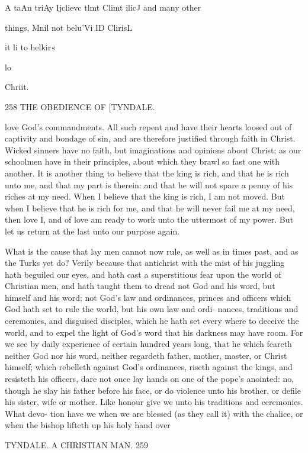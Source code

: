 \documentclass{custom}
\begin{document}
{{A taAn triAy 
Ijclievc tlmt 
Climt ilicJ 
and many 
other 

things, Mnil 
not belu'Vi 
ID ClirisL 

\V\m it li 
to helkir« 

lo 

Chriit. 


258
THE OBEDIENCE OF
[TYNDALE.

love God's commandments. All such repent and have 
their hearts loosed out of captivity and bondage of sin, 
and are therefore justified through faith in Christ. Wicked 
sinners have no faith, but imaginations and opinions about 
Christ; as our schoolmen have in their principles, about 
which they brawl so fast one with another. It is another 
thing to believe that the king is rich, and that he is rich 
unto me, and that my part is therein: and that he will not 
spare a penny of his riches at my need. When I believe that 
the king is rich, I am not moved. But when I believe 
that he is rich for me, and that he will never fail me at my 
need, then love I, and of love am ready to work unto the 
uttermost of my power. But let us return at the last 
unto our purpose again. 

What is the cause that lay men cannot now rule, as 
well as in times past, and as the Turks yet do? Verily 
because that antichrist with the mist of his juggling hath 
beguiled our eyes, and hath cast a superstitious fear upon 
the world of Christian men, and hath taught them to 
dread not God and his word, but himself and his word; 
not God's law and ordinances, princes and officers which 
God hath set to rule the world, but his own law and ordi- 
nances, traditions and ceremonies, and disguised disciples, 
which he hath set every where to deceive the world, and 
to expel the light of God's word that his darkness may 
have room. For we see by daily experience of certain 
hundred years long, that he which feareth neither God nor 
his word, neither regardeth father, mother, master, or 
Christ himself; which rebelleth against God's ordinances, 
riseth against the kings, and resisteth his officers, dare not 
once lay hands on one of the pope's anointed: no, though 
he slay his father before his face, or do violence unto his 
brother, or defile his sister, wife or mother. Like honour 
give we unto his traditions and ceremonies. What devo- 
tion have we when we are blessed (as they call it) with the 
chalice, or when the bishop lifteth up his holy hand over 


TYNDALE.
A CHRISTIAN MAN.
259

}}
\end{document}
